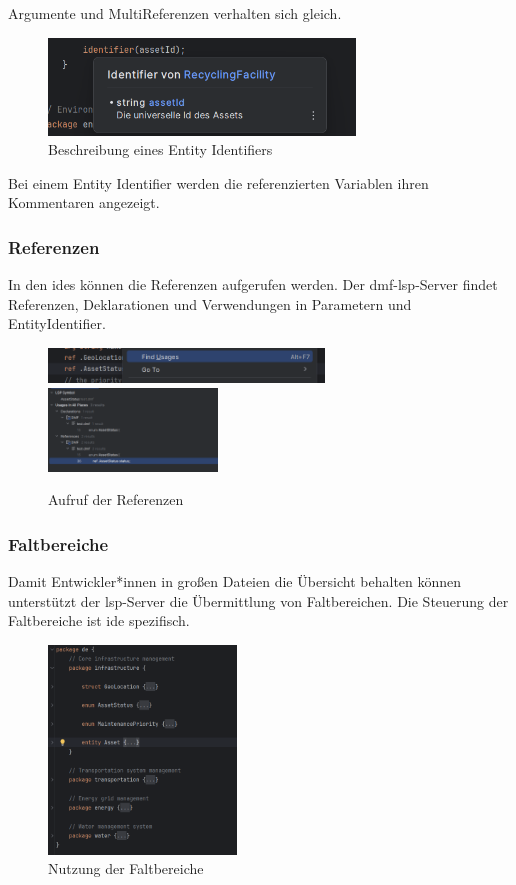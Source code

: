 \documentclass[./einleitung.tex]{subfiles}
\begin{document}
    Argumente und MultiReferenzen verhalten sich gleich.
    \begin{figure}[H]
        \centering
        \includegraphics[height=7em]{bilder/hover-entity-identifier}
        \caption{Beschreibung eines Entity Identifiers}
        \label{fig:hover-entity-identifier}
    \end{figure}
    Bei einem Entity Identifier werden die referenzierten Variablen ihren Kommentaren angezeigt.

    \subsubsection{Referenzen}
    In den \acrshort{ide}s können die Referenzen aufgerufen werden.
    Der \acrshort{dmf}-\acrshort{lsp}-Server findet Referenzen, Deklarationen und Verwendungen in Parametern und EntityIdentifier.
    \begin{figure}[H]
        \centering
        \includegraphics[height=2.5em]{bilder/callReferencen}
        \includegraphics[height=6em]{bilder/referencen}
        \caption{Aufruf der Referenzen}
        \label{fig:callreferencen}
    \end{figure}

    \subsubsection{Faltbereiche}
    Damit Entwickler*innen in großen Dateien die Übersicht behalten können unterstützt der \acrshort{lsp}-Server die Übermittlung von Faltbereichen.
    Die Steuerung der Faltbereiche ist \acrshort{ide} spezifisch.
    \begin{figure}[H]
        \centering
        \includegraphics[height=15em]{bilder/faltbereich}
        \caption{Nutzung der Faltbereiche}
        \label{fig:faltbereich}
    \end{figure}
\end{document}
